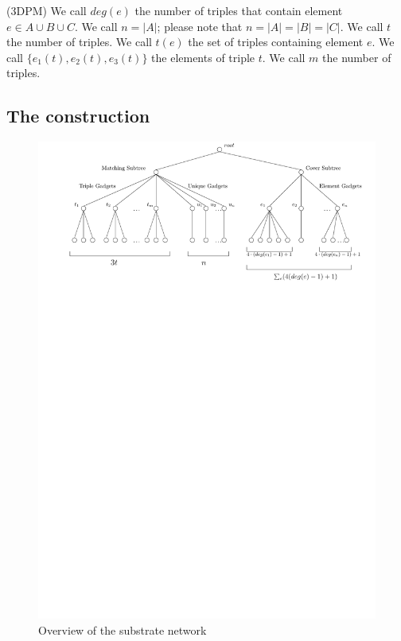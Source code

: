 \documentclass[conference,10pt]{IEEEtran}
\begin{document}
(3DPM) We call $deg(e)$ the number of triples that contain element
$e\in A\cup B\cup C$. We call $n=|A|$; please note that
$n=|A|=|B|=|C|$. We call $t$ the number of triples. We call $t(e)$ the
set of triples containing element $e$. We call
$\lbrace e_1(t), e_2(t), e_3(t) \rbrace$ the elements of triple $t$. We call $m$ the number of triples.

\subsection{The construction}

\begin{figure}[t]
\centering
\includegraphics[width=0.99\columnwidth]{reduction/overview.pdf}
\vspace{-1em}
\caption{Overview of the substrate network}
\vspace{-1em}
\end{figure}
\end{document}
